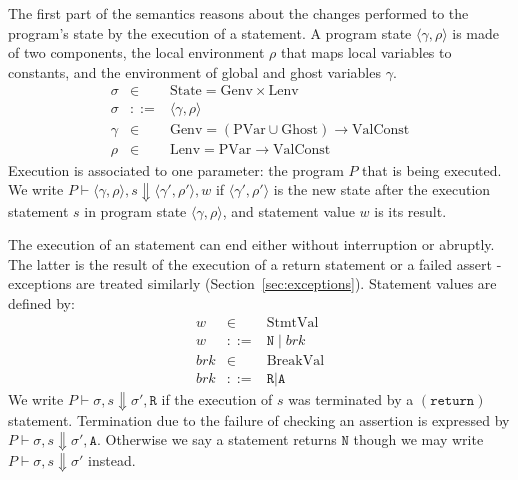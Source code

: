 \documentclass[10pt,notitlepage,twoside]{article}
\newcommand{\retval}[1]{\texttt{R}}
\newcommand{\normval}{\texttt{N}}
\newcommand{\assertval}[1]{\texttt{A}}
\newcommand{\brk}{\mathit{brk}}
\newcommand{\eval}[2]{P \vdash #1 \Downarrow #2}
\newcommand{\state}[1]{\langle #1 \rangle}
\newcommand{\genv}{\gamma}
\begin{document}
The first part of the semantics reasons about the changes performed to the program's state by the execution of a statement. 
A program state $\state{\genv,\rho} $ is made of two components, the local environment $\rho$ that maps local variables to constants, and the environment of  global and ghost variables $\genv$.
\begin{displaymath}
\begin{array}{rcl}
\sigma & \in & \textrm{State} = \textrm{Genv} \times \textrm{Lenv} \\
\sigma & ::= & \state{\genv,\rho} \\
\genv & \in & \textrm{Genv} = (\textrm{PVar} \cup \textrm{Ghost}) \rightarrow \textrm{ValConst} \\
\rho & \in & \textrm{Lenv} = \textrm{PVar} \rightarrow \textrm{ValConst}
\end{array}
\end{displaymath}
Execution is associated to one parameter: the program $P$ that is being executed.
We write $\eval{\state{\genv,\rho},s}{\state{\genv',\rho'},w}$ if  $\state{\genv',\rho'}$ is  the new state after the execution statement $s$ in program state $\state{\genv,\rho}$, and statement value $w$ is its result.



The execution of an statement can end either without interruption  or abruptly. The latter is the result of the execution of a return statement or a failed assert - exceptions are treated similarly (Section~\ref{sec:exceptions}).
Statement values are defined by:
\begin{displaymath}
\begin{array}{rcl}
w & \in & \textrm{StmtVal} \\
w & ::= & \normval \mid \brk \\
\brk & \in & \textrm{BreakVal} \\
\brk & ::= & \retval{} \mid \assertval{} 
\end{array}
\end{displaymath}
We write $\eval{\sigma,s}{\sigma',\retval{}}$ if the execution of $s$ was terminated by a $(\texttt{return})$ statement.
Termination due to the failure of checking an assertion is expressed by $\eval{\sigma,s}{\sigma',\assertval{}}$.
Otherwise we say a statement returns $\normval$ though we may  write $\eval{\sigma,s}{\sigma'}$ instead.
\end{document}
